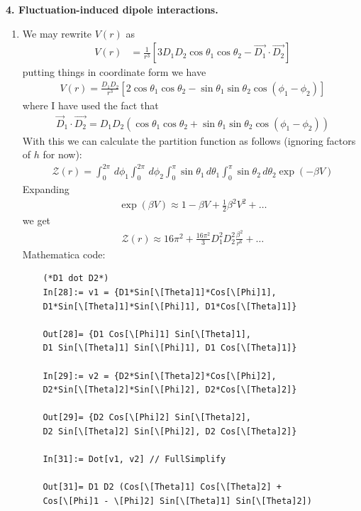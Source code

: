 \documentclass{article}
\theoremstyle{definition}
\newcommand{\be}{\beta}
\newcommand{\f}[2]{\frac{#1}{#2}}
\newcommand{\lb}{\left[}
\newcommand{\rb}{\right]}
\begin{document}
\noindent \textbf{4. Fluctuation-induced dipole interactions.}

\begin{enumerate}[label=(\alph*)]
	\item We may rewrite $V(r)$ as 
	\begin{align*} 
	V(r) 
	&= \f{1}{r^3} \lb 3D_1 D_2 \cos\theta_1 \cos\theta_2  - \vec{D_1} \cdot \vec{D_2} \rb
 	\end{align*}
 	putting things in coordinate form we have
 	\begin{align*}
 	V(r) = \f{D_1 D_2}{r^3}\lb 2\cos\theta_1 \cos\theta_2 - \sin\theta_1\sin\theta_2\cos(\phi_1 - \phi_2) \rb
 	\end{align*}
 	where I have used the fact that
 	\begin{align*}
 	\vec{D}_1 \cdot \vec{D_2} = D_1D_2 (\cos\theta_1\cos\theta_2 + \sin\theta_1\sin\theta_2\cos(\phi_1-\phi_2))
 	\end{align*}
 	With this we can calculate the partition function as follows (ignoring factors of $h$ for now):
 	\begin{align*}
	\mathcal{Z}(r) = \int_0^{2\pi}\,d\phi_1 \int_0^{2\pi}\,d\phi_2 \int_0^\pi \sin\theta_1 \, d\theta_1 \int_0^\pi \sin\theta_2\, d\theta_2 \exp(-\be V) 
	\end{align*}
	Expanding 
	\begin{align*}
	\exp(\be V) \approx 1 - \be V + \f{1}{2}\be^2 V^2 + \dots 
	\end{align*}
	we get
	\begin{align*}
	\boxed{\mathcal{Z}(r) \approx 16\pi^2 + \f{16\pi^2}{3}D_1^2D_2^2 \f{\beta^2}{r^6} + \dots}
	\end{align*}
	Mathematica code:
	\begin{lstlisting}
	(*D1 dot D2*)
	In[28]:= v1 = {D1*Sin[\[Theta]1]*Cos[\[Phi]1], 
	D1*Sin[\[Theta]1]*Sin[\[Phi]1], D1*Cos[\[Theta]1]}
	
	Out[28]= {D1 Cos[\[Phi]1] Sin[\[Theta]1], 
	D1 Sin[\[Theta]1] Sin[\[Phi]1], D1 Cos[\[Theta]1]}
	
	In[29]:= v2 = {D2*Sin[\[Theta]2]*Cos[\[Phi]2], 
	D2*Sin[\[Theta]2]*Sin[\[Phi]2], D2*Cos[\[Theta]2]}
	
	Out[29]= {D2 Cos[\[Phi]2] Sin[\[Theta]2], 
	D2 Sin[\[Theta]2] Sin[\[Phi]2], D2 Cos[\[Theta]2]}
	
	In[31]:= Dot[v1, v2] // FullSimplify
	
	Out[31]= D1 D2 (Cos[\[Theta]1] Cos[\[Theta]2] + 
	Cos[\[Phi]1 - \[Phi]2] Sin[\[Theta]1] Sin[\[Theta]2])
	

\end{lstlisting}
\end{enumerate}
\end{document}
